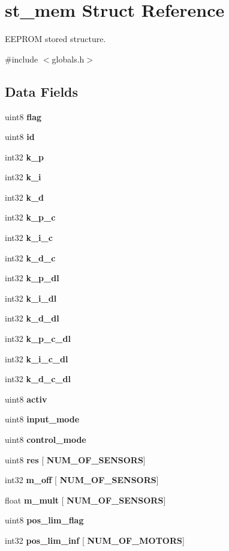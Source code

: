 \section{st\+\_\+mem Struct Reference}
\label{structst__mem}


E\+E\+P\+R\+OM stored structure.  




{\ttfamily \#include $<$globals.\+h$>$}

\subsection*{Data Fields}
\begin{DoxyCompactItemize}
\item 
uint8 \textbf{ flag}
\item 
uint8 \textbf{ id}
\item 
int32 \textbf{ k\+\_\+p}
\item 
int32 \textbf{ k\+\_\+i}
\item 
int32 \textbf{ k\+\_\+d}
\item 
int32 \textbf{ k\+\_\+p\+\_\+c}
\item 
int32 \textbf{ k\+\_\+i\+\_\+c}
\item 
int32 \textbf{ k\+\_\+d\+\_\+c}
\item 
int32 \textbf{ k\+\_\+p\+\_\+dl}
\item 
int32 \textbf{ k\+\_\+i\+\_\+dl}
\item 
int32 \textbf{ k\+\_\+d\+\_\+dl}
\item 
int32 \textbf{ k\+\_\+p\+\_\+c\+\_\+dl}
\item 
int32 \textbf{ k\+\_\+i\+\_\+c\+\_\+dl}
\item 
int32 \textbf{ k\+\_\+d\+\_\+c\+\_\+dl}
\item 
uint8 \textbf{ activ}
\item 
uint8 \textbf{ input\+\_\+mode}
\item 
uint8 \textbf{ control\+\_\+mode}
\item 
uint8 \textbf{ res} [\textbf{ N\+U\+M\+\_\+\+O\+F\+\_\+\+S\+E\+N\+S\+O\+RS}]
\item 
int32 \textbf{ m\+\_\+off} [\textbf{ N\+U\+M\+\_\+\+O\+F\+\_\+\+S\+E\+N\+S\+O\+RS}]
\item 
float \textbf{ m\+\_\+mult} [\textbf{ N\+U\+M\+\_\+\+O\+F\+\_\+\+S\+E\+N\+S\+O\+RS}]
\item 
uint8 \textbf{ pos\+\_\+lim\+\_\+flag}
\item 
int32 \textbf{ pos\+\_\+lim\+\_\+inf} [\textbf{ N\+U\+M\+\_\+\+O\+F\+\_\+\+M\+O\+T\+O\+RS}]

\end{DoxyCompactItemize}
